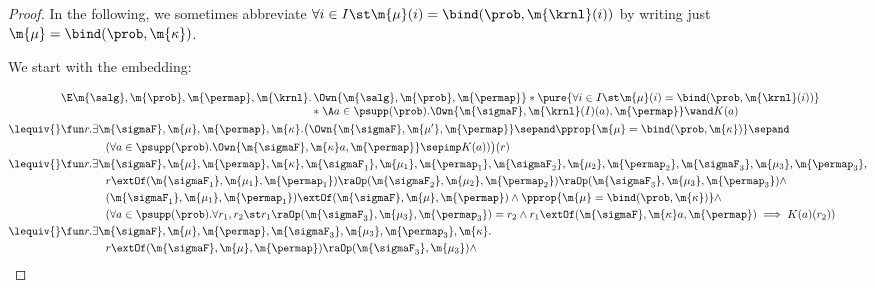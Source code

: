\begin{proof}
	In the following, we sometimes abbreviate
	${\forall i\in I\st
                \m{\mu}(i) = \bind(\prob, \m{\krnl}(i))}$
	by writing just ${\m{\mu} = \bind(\prob, \m{\kappa})}$.

	We start with the embedding:

	\begin{align*}
				&\begin{array}[t]{@{}r@{\,}l@{}}
        \E \m{\salg}, \m{\prob}, \m{\permap}, \m{\krnl}.
        & \Own{\m{\salg}, \m{\prob}, \m{\permap}} *
        \pure{\forall i\in I\st
                \m{\mu}(i) = \bind(\prob, \m{\krnl}(i))}
        \\ & * \;
        \A a \in \psupp(\prob).
          \Own{\m{\sigmaF}, \m{\krnl}(I)(a), \m{\permap}}
          \wand
            K(a)
 			 \end{array}\\
{}\lequiv {} &
				\fun r.
        \exists \m{\sigmaF}, \m{\mu}, \m{\permap}, \m{\kappa}.
        \big(\Own{\m{\sigmaF}, \m{\mu'}, \m{\permap}} \sepand
				\pprop{\m{\mu} = \bind(\prob, \m{\kappa})} \sepand \\
					&\qquad \qquad
        (\forall a \in \psupp(\prob). \Own{\m{\sigmaF}, \m{\kappa} a, \m{\permap}} \sepimp K(a)) \big) (r) \\
{}\lequiv {} &
			 \fun r.
				\exists \m{\sigmaF}, \m{\mu},  \m{\permap},  \m{\kappa},
				\m{\sigmaF_1}, \m{\mu_1},  \m{\permap_1},
				\m{\sigmaF_2}, \m{\mu_2}, \m{\permap_2},
				\m{\sigmaF_3}, \m{\mu_3}, \m{\permap_3}, \\
				&\qquad \qquad
				r \extOf (\m{\sigmaF_1}, \m{\mu_1}, \m{\permap_1}) \raOp
				(\m{\sigmaF_2}, \m{\mu_2}, \m{\permap_2}) \raOp (\m{\sigmaF_3}, \m{\mu_3}, \m{\permap_3}) \land\\
				&\qquad \qquad
				(\m{\sigmaF_1}, \m{\mu_1}, \m{\permap_1}) \extOf (\m{\sigmaF}, \m{\mu}, \m{\permap})  \land
				\pprop{\m{\mu} = \bind(\prob, \m{\kappa})} \land \\
				&\qquad \qquad
				(\forall a \in \psupp(\prob). \forall r_1, r_2 \st
				r_1 \raOp (\m{\sigmaF_3}, \m{\mu_3}, \m{\permap_3}) = r_2 \land
				r_1 \extOf (\m{\sigmaF}, \m{\kappa} a, \m{\permap})
				\implies K(a)(r_2))\\
{}\lequiv {} &
				\fun r.
				\exists \m{\sigmaF}, \m{\mu}, \m{\permap},
				\m{\sigmaF_3}, \m{\mu_3}, \m{\permap_3}, \m{\kappa}. \\
				& \qquad \qquad
				r \extOf
				(\m{\sigmaF}, \m{\mu}, \m{\permap})  \raOp (\m{\sigmaF_3}, \m{\mu_3}) \land

\end{align*}
\end{proof}
